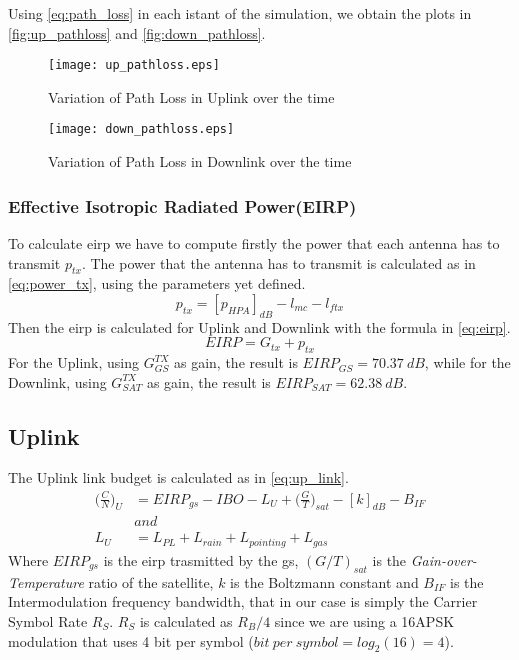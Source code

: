 		Using \autoref{eq:path_loss} in each istant of the simulation, we obtain the plots in \autoref{fig:up_pathloss} and \autoref{fig:down_pathloss}.

		\begin{figure}[ht]
			\begin{minipage}{.5\textwidth}
			\centering
			\texttt{[image: up\_pathloss.eps]}
			\caption{Variation of Path Loss in Uplink over the time}
			\label{fig:up_pathloss}
			\end{minipage}\hspace{0.5cm}
			\begin{minipage}{.5\textwidth}
			\centering
			\texttt{[image: down\_pathloss.eps]}
			\caption{Variation of Path Loss in Downlink over the time}
			\label{fig:down_pathloss}
			\end{minipage}
		\end{figure}
	\subsubsection{Effective Isotropic Radiated Power(EIRP)}
	To calculate \gls{eirp} we have to compute firstly the power that each antenna has to transmit $p_{tx}$.
	The power that the antenna has to transmit is calculated as in \autoref{eq:power_tx}, using the parameters yet defined.
	\begin{equation}\label{eq:power_tx}
		p_{tx} = [p_{HPA}]_{dB} - l_{mc} - l_{ftx}
	\end{equation}
	Then the \gls{eirp} is calculated for Uplink and Downlink with the formula in \autoref{eq:eirp}.
	\begin{equation}\label{eq:eirp}
		EIRP = G_{tx} + p_{tx}
	\end{equation}
	For the Uplink, using $G_{GS}^{TX}$ as gain, the result is $EIRP_{GS} = 70.37 ~dB$, while for the Downlink, using $G_{SAT}^{TX}$ as gain, the result is $EIRP_{SAT} = 62.38 ~dB$.
\subsection{Uplink}
	The Uplink link budget is calculated as in \autoref{eq:up_link}.
	\begin{equation} \label{eq:up_link}
		\begin{split}
			\bigg(\frac{C}{N}\bigg)_U &= EIRP_{gs} - IBO - L_U + \bigg(\frac{G}{T}\bigg)_{sat} - [k]_{dB} - B_{IF}\\
			&and\\
			L_U &= L_{PL} + L_{rain} + L_{pointing} + L_{gas}
		\end{split}
	\end{equation}
	Where $EIRP_{gs}$ is the \gls{eirp} trasmitted by the \gls{gs}, $(G/T)_{sat}$ is the \textit{Gain-over-Temperature} ratio of the satellite, $k$ is the Boltzmann constant and $B_{IF}$ is the Intermodulation frequency bandwidth, that in our case is simply the Carrier Symbol Rate $R_S$.
	$R_S$ is calculated as $R_B/4$ since we are using a 16APSK modulation that uses 4 bit per symbol ($bit ~per ~symbol = log_2(16) = 4$).

